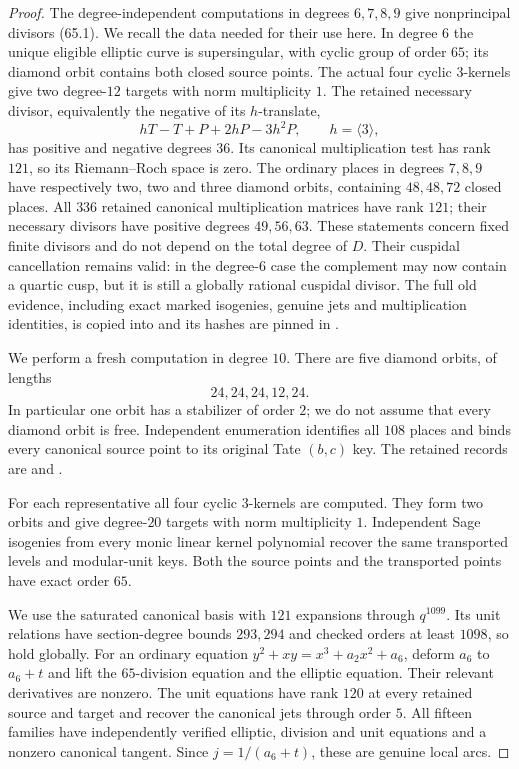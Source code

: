 \begin{proof}
The degree-independent computations in degrees $6,7,8,9$ give
nonprincipal divisors (65.1). We recall the data needed for their
use here. In degree $6$ the unique eligible elliptic curve is
supersingular, with cyclic group of order $65$; its diamond orbit
contains both closed source points. The actual four cyclic
$3$-kernels give two degree-$12$ targets with norm multiplicity $1$.
The retained necessary divisor, equivalently the negative of its
$h$-translate,
\[
                 hT-T+P+2hP-3h^2P,\qquad h=\langle3\rangle,
\]
has positive and negative degrees $36$. Its canonical multiplication
test has rank $121$, so its Riemann--Roch space is zero. The ordinary
places in degrees $7,8,9$ have respectively two, two and three
diamond orbits, containing $48,48,72$ closed places. All $336$
retained canonical multiplication matrices have rank $121$; their
necessary divisors have positive degrees $49,56,63$.
These statements concern fixed finite divisors and do not depend
on the total degree of $D$. Their cuspidal cancellation remains
valid: in the degree-$6$ case the complement may now contain a
quartic cusp, but it is still a globally rational cuspidal divisor.
The full old evidence, including exact marked isogenies, genuine
jets and multiplication identities, is copied into
 and its hashes are pinned in
.

We perform a fresh computation in degree $10$. There are five
diamond orbits, of lengths
\[
                           24,24,24,12,24.
\]
In particular one orbit has a stabilizer of order $2$; we do not
assume that every diamond orbit is free. Independent enumeration
identifies all $108$ places and binds every canonical source point
to its original Tate $(b,c)$ key. The retained records are
 and .

For each representative all four cyclic $3$-kernels are computed.
They form two orbits and give degree-$20$ targets with norm
multiplicity $1$. Independent Sage isogenies from every monic
linear kernel polynomial recover the same transported levels and
modular-unit keys. Both the source points and the transported
points have exact order $65$.

We use the saturated canonical basis with $121$ expansions through
$q^{1099}$. Its unit relations have section-degree bounds $293,294$
and checked orders at least $1098$, so hold globally. For an ordinary
equation $y^2+xy=x^3+a_2x^2+a_6$, deform $a_6$ to $a_6+t$ and
lift the $65$-division equation and the elliptic equation. Their
relevant derivatives are nonzero. The unit equations have rank
$120$ at every retained source and target and recover the canonical
jets through order $5$. All fifteen families have independently
verified elliptic, division and unit equations and a nonzero
canonical tangent. Since $j=1/(a_6+t)$, these are genuine local arcs.


\end{proof}
